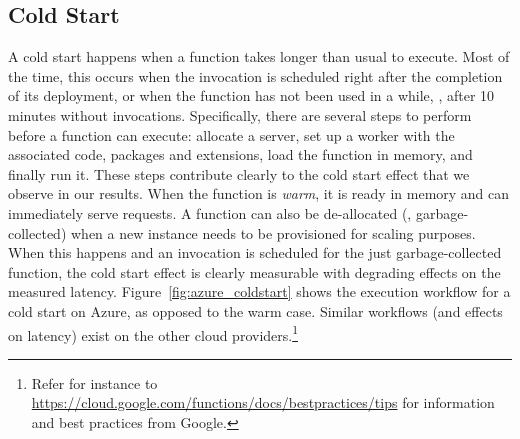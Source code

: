 
\subsection{Cold Start}
\label{sec:coldstart}

A cold start happens when a function takes longer than usual to execute. 
Most of the time, this occurs when the invocation is scheduled right after the completion of its deployment, or when the function has not been used in a while, \eg, after 10 minutes without invocations.
Specifically, there are several steps to perform before a function can execute: allocate a server, set up a worker with the associated code, packages and extensions, load the function in memory, and finally run it.
These steps contribute clearly to the cold start effect that we observe in our results.
When the function is \emph{warm}, it is ready in memory and can immediately serve requests.
A function can also be de-allocated (\ie, garbage-collected) when a new instance needs to be provisioned for scaling purposes. 
When this happens and an invocation is scheduled for the just garbage-collected function, the cold start effect is clearly measurable with degrading effects on the measured latency.
Figure~\ref{fig:azure_coldstart} shows the execution workflow for a cold start on Azure, as opposed to the warm case. 
Similar workflows (and effects on latency) exist on the other cloud providers.\footnote{Refer for instance to \url{https://cloud.google.com/functions/docs/bestpractices/tips} for information and best practices from Google.}

